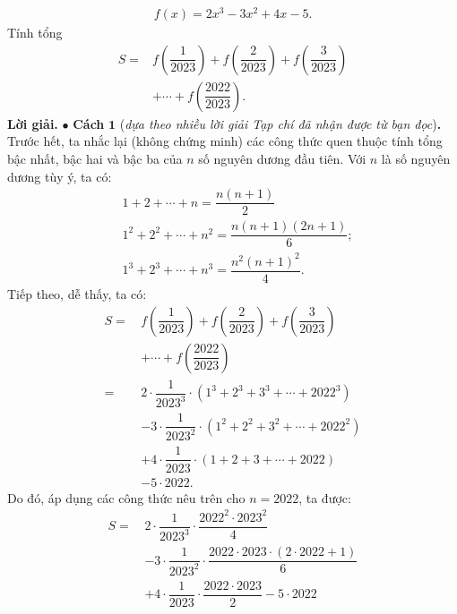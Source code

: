 \begin{multicols}{2}
\begin{align*}
		f\left( x \right) = 2{x^3} - 3{x^2} + 4x - 5.
	\end{align*}
	Tính tổng
	\begin{align*}
		S =& f\left( {\dfrac{1}{{2023}}} \right) + f\left( {\dfrac{2}{{2023}}} \right) + f\left( {\dfrac{3}{{2023}}} \right) \\
		&+  \cdots  + f\left( {\dfrac{{2022}}{{2023}}} \right).
	\end{align*}
	\textbf{\color{thachthuctoanhoc}Lời giải.}
	\vskip 0.05cm
	$\bullet$ \textbf{\color{thachthuctoanhoc}Cách} $\pmb{1}$ (\textit{dựa theo nhiều lời giải Tạp chí đã nhận được từ bạn đọc})\textbf{\color{thachthuctoanhoc}.}
	\vskip 0.05cm
	Trước hết, ta nhắc lại (không chứng minh) các công thức quen thuộc tính tổng bậc nhất, bậc hai và bậc ba của $n$ số nguyên dương đầu tiên.
	\vskip 0.05cm
	Với $n$ là số nguyên dương tùy ý, ta có:
	\begin{align*}
		&1 + 2 +  \cdots  + n = \dfrac{{n\left( {n + 1} \right)}}{2}\\
		&{1^2} + {2^2} +  \cdots  + {n^2} = \dfrac{{n\left( {n + 1} \right)\left( {2n + 1} \right)}}{6};\\
		&{1^3} + {2^3} +  \cdots  + {n^3} = \dfrac{{{n^2}{{\left( {n + 1} \right)}^2}}}{4}.
	\end{align*}
	Tiếp theo, dễ thấy, ta có:
	\begin{align*}
			S =\, &f\left( {\dfrac{1}{{2023}}} \right) + f\left( {\dfrac{2}{{2023}}} \right) + f\left( {\dfrac{3}{{2023}}} \right) \\
			&+  \cdots  + f\left( {\dfrac{{2022}}{{2023}}} \right)\\
			 =\,\, &2 \cdot \dfrac{1}{{{{2023}^3}}} \cdot \left( {{1^3} + {2^3} + {3^3} +  \cdots  + {{2022}^3}} \right) \\
			 &-\! 3 \!\cdot\! \dfrac{1}{{{{2023}^2}}} \!\cdot\! \left( {{1^2} \!+ {2^2} \!+ {3^2} \!+  \cdots  \!+ {{2022}^2}} \right)\\
			 &+ 4 \cdot \dfrac{1}{{2023}} \cdot \left( {1 + 2 + 3 +  \cdots  + 2022} \right) \\
			 &- 5 \cdot 2022.
	\end{align*}
	Do đó, áp dụng các công thức nêu trên cho $n = 2022$, ta được:
	\begin{align*}
			S =\, &2 \cdot \dfrac{1}{{{{2023}^3}}} \cdot \dfrac{{{{2022}^2} \cdot {{2023}^2}}}{4} \\
			&- 3 \cdot \dfrac{1}{{{{2023}^2}}} \cdot \dfrac{{2022 \cdot 2023 \cdot \left( {2 \cdot 2022 + 1} \right)}}{6} \\
			&+ 4 \cdot \dfrac{1}{{2023}} \cdot \dfrac{{2022 \cdot 2023}}{2} - 5 \cdot 2022\\

\end{align*}
\end{multicols}
